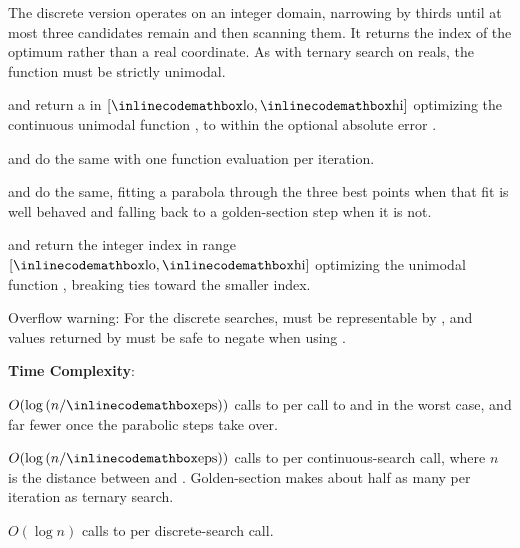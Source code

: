The discrete version operates on an integer domain, narrowing by thirds until at most three candidates remain and then scanning them. It returns the index of the optimum rather than a real coordinate. As with ternary search on reals, the function must be strictly unimodal.

\begin{compactitem}
  \item {} and  return a   in $[{\inlinecodemath{lo}}, {\inlinecodemath{hi}}]$ optimizing the continuous unimodal function , to within the optional absolute error .
  \item {} and  do the same with one function evaluation per iteration.
  \item {} and  do the same, fitting a parabola through the three best points when that fit is well behaved and falling back to a golden-section step when it is not.
  \item {} and  return the integer index in range $[{\inlinecodemath{lo}}, {\inlinecodemath{hi}}]$ optimizing the unimodal function , breaking ties toward the smaller index.
\end{compactitem}

Overflow warning: For the discrete searches,  must be representable by , and values returned by  must be safe to negate when using .

\textbf{Time Complexity}:
\begin{compactitem}
  \item $O(\log\left(n / {\inlinecodemath{eps}}\right))$ calls to  per call to  and  in the worst case, and far fewer once the parabolic steps take over.
  \item $O(\log\left(n / {\inlinecodemath{eps}}\right))$ calls to  per continuous-search call, where $n$ is the distance between  and . Golden-section makes about half as many per iteration as ternary search.
  \item $O(\log n)$ calls to  per discrete-search call.
\end{compactitem}

